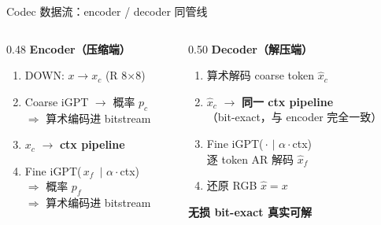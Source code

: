 \documentclass[10pt,aspectratio=169]{beamer}
\begin{document}
\begin{frame}{Codec 数据流：encoder / decoder 同管线}
\begin{columns}[T]
\begin{column}{0.48\textwidth}
\textbf{Encoder（压缩端）}
\begin{enumerate}
  \item DOWN: $x \to x_c$ (R 8$\times$8)
  \item Coarse iGPT $\to$ 概率 $p_c$ \\
        $\Rightarrow$ 算术编码进 bitstream
  \item $x_c$ $\to$ \textbf{ctx pipeline}
  \item Fine iGPT(\,$x_f$ \,$|$ $\alpha\cdot$ctx) \\
        $\Rightarrow$ 概率 $p_f$ \\
        $\Rightarrow$ 算术编码进 bitstream
\end{enumerate}
\end{column}
\begin{column}{0.50\textwidth}
\textbf{Decoder（解压端）}
\begin{enumerate}
  \item 算术解码 coarse token $\hat{x}_c$
  \item $\hat{x}_c$ $\to$ \textbf{同一 ctx pipeline} \\
        {\scriptsize（bit-exact，与 encoder 完全一致）}
  \item Fine iGPT(\,$\cdot$ $|$ $\alpha\cdot$ctx) \\
        逐 token AR 解码 $\hat{x}_f$
  \item 还原 RGB $\hat{x} = x$
\end{enumerate}

\bigskip
\centering
\alert{\textbf{无损 \quad bit-exact \quad 真实可解}}
\end{column}
\end{columns}
\end{frame}
\end{document}
